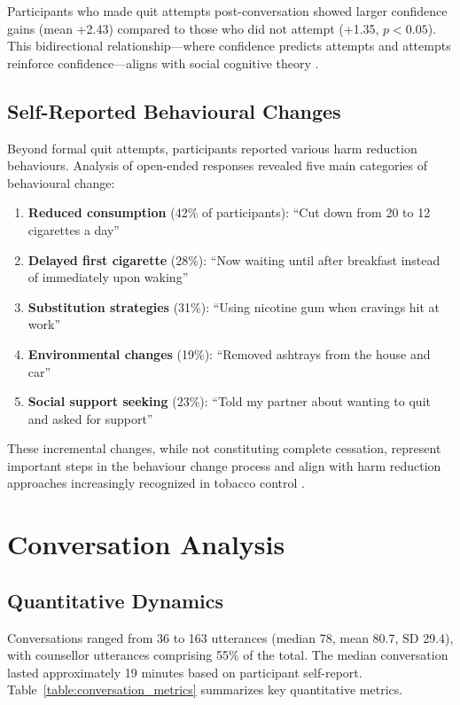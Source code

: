 Participants who made quit attempts post-conversation showed larger confidence gains (mean +2.43) compared to those who did not attempt (+1.35, $p<0.05$). This bidirectional relationship---where confidence predicts attempts and attempts reinforce confidence---aligns with social cognitive theory \citep{Bandura1986}.

\subsection{Self-Reported Behavioural Changes}

Beyond formal quit attempts, participants reported various harm reduction behaviours. Analysis of open-ended responses revealed five main categories of behavioural change:

\begin{enumerate}
\item \textbf{Reduced consumption} (42\% of participants): ``Cut down from 20 to 12 cigarettes a day''
\item \textbf{Delayed first cigarette} (28\%): ``Now waiting until after breakfast instead of immediately upon waking''
\item \textbf{Substitution strategies} (31\%): ``Using nicotine gum when cravings hit at work''
\item \textbf{Environmental changes} (19\%): ``Removed ashtrays from the house and car''
\item \textbf{Social support seeking} (23\%): ``Told my partner about wanting to quit and asked for support''
\end{enumerate}

These incremental changes, while not constituting complete cessation, represent important steps in the behaviour change process and align with harm reduction approaches increasingly recognized in tobacco control \citep{Abrams2018}.

\section{Conversation Analysis}
\label{sec:conversation-analysis}

\subsection{Quantitative Dynamics}
\label{sec:conversation-dynamics}

Conversations ranged from 36 to 163 utterances (median 78, mean 80.7, SD 29.4), with counsellor utterances comprising 55\% of the total. The median conversation lasted approximately 19 minutes based on participant self-report. Table~\ref{table:conversation_metrics} summarizes key quantitative metrics.

